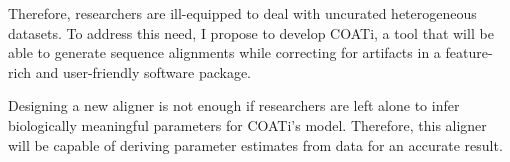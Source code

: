 Therefore, researchers are ill-equipped to deal with uncurated heterogeneous
datasets.
To address this need, I propose to develop COATi, a tool that will be able to
generate sequence alignments while correcting for artifacts in a feature-rich
and user-friendly software package.

Designing a new aligner is not enough if researchers are left alone to infer
biologically meaningful parameters for COATi's model.
Therefore, this aligner will be capable of deriving parameter estimates from
data for an accurate result.

